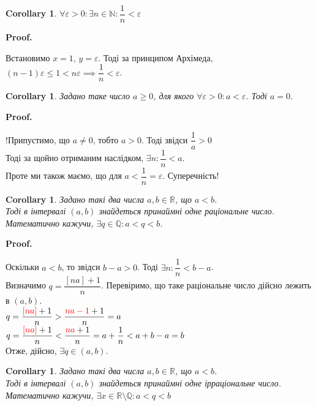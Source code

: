 \documentclass[a4paper, 14pt]{article}
\makeatletter
\def\qed{$\blacksquare$}
\theoremstyle{theoremdd}
\theoremstyle{theoremdd}
\theoremstyle{theoremdd}
\theoremstyle{theoremdd}
\theoremstyle{theoremdd}
\theoremstyle{theoremdd}
\theoremstyle{theoremdd}
\theoremstyle{theoremdd}
\newtheorem{corollary}[theorem]{Corollary}
\renewenvironment{proof}[1][Proof.\\]{\par
\pushQED{\hfill \qed}%
\normalfont \topsep6\p@\@plus6\p@\relax
\trivlist
\item\relax
{\bfseries
#1\@addpunct{.}}\hspace\labelsep\ignorespaces
}{%
\popQED\endtrivlist\@endpefalse
}
\makeatother
\begin{document}
	\begin{corollary}
	$\forall \varepsilon > 0: \exists n \in \mathbb{N}: \dfrac{1}{n} < \varepsilon$
	\end{corollary}
	
	\begin{proof}
	Встановимо $x = 1$, $y = \varepsilon$. Тоді за принципом Архімеда, $(n-1)\varepsilon \leq 1 < n\varepsilon \implies \dfrac{1}{n} < \varepsilon$.
	\end{proof}
	
	\begin{corollary}
	Задано таке число $a \geq 0$, для якого $\forall \varepsilon > 0: a < \varepsilon$. Тоді $a = 0$.
	\end{corollary}
	
	\begin{proof}
	!Припустимо, що $a \neq 0$, тобто $a > 0$. Тоді звідси $\dfrac{1}{a} > 0$\\
	Тоді за щойно отриманим наслідком, $\exists n: \dfrac{1}{n} < a$.\\
	Проте ми також маємо, що для $a < \dfrac{1}{n} = \varepsilon$. Суперечність!
	\end{proof}
	
	\begin{corollary}
	Задано такі два числа $a,b \in \mathbb{R}$, що $a < b$.\\
	Тоді в інтервалі $(a,b)$ знайдеться принаймні одне раціональне число.\\
	Математично кажучи, $\exists q \in \mathbb{Q}: a < q < b$.
	\end{corollary}
	
	\begin{proof}
	Оскільки $a<b$, то звідси $b-a>0$. Тоді $\exists n: \dfrac{1}{n} < b-a$.\\
	Визначимо $q = \dfrac{[na]+1}{n}$. Перевіримо, що таке раціональне число дійсно лежить в $(a,b)$.\\
	$q = \dfrac{\textcolor{red}{[na]}+1}{n} > \dfrac{\textcolor{red}{na-1}+1}{n} = a$\\
	$q = \dfrac{\textcolor{red}{[na]}+1}{n} < \dfrac{\textcolor{red}{na}+1}{n}= a + \dfrac{1}{n} < a + b - a = b$\\
	Отже, дійсно, $\exists q \in (a,b)$.
\end{proof}

	\begin{corollary}
	Задано такі два числа $a,b \in \mathbb{R}$, що $a < b$.\\
	Тоді в інтервалі $(a,b)$ знайдеться принаймні одне ірраціональне число.\\
	Математично кажучи, $\exists x \in \mathbb{R} \setminus \mathbb{Q}: a < q < b$
	\end{corollary}
	
\end{document}
